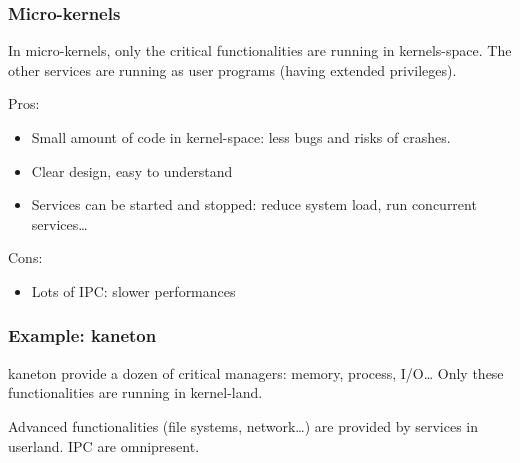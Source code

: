 \begin{frame}
  \frametitle{Micro-kernels}

  In micro-kernels, only the critical functionalities are running in kernels-space. The other services are running as user programs (having extended privileges).

  \-

  Pros:

  \begin{itemize}
  \item
    Small amount of code in kernel-space: less bugs and risks of crashes.
  \item
    Clear design, easy to understand
  \item
    Services can be started and stopped: reduce system load, run concurrent services\ldots
  \end{itemize}

  \-

  Cons:

  \begin{itemize}
  \item
    Lots of IPC: slower performances
  \end{itemize}

\end{frame}

%
%

\begin{frame}
  \frametitle{Example: kaneton}

  kaneton provide a dozen of critical managers: memory, process,
  I/O\ldots{} Only these functionalities are running in kernel-land.

  \begin{center}
  \end{center}

  Advanced functionalities (file systems, network\ldots) are provided by services in userland. IPC are omnipresent.

\end{frame}

